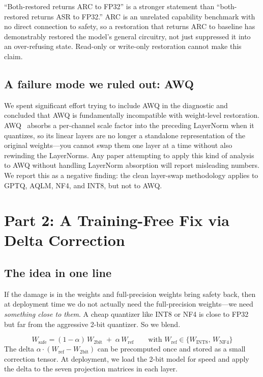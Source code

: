 \documentclass[11pt]{article}
\begin{document}
\begin{findingbox}
``Both-restored returns ARC to FP32'' is a stronger statement than ``both-restored returns ASR to FP32.'' ARC is an unrelated capability benchmark with no direct connection to safety, so a restoration that returns ARC to baseline has demonstrably restored the model's general circuitry, not just suppressed it into an over-refusing state. Read-only or write-only restoration cannot make this claim.
\end{findingbox}

\subsection{A failure mode we ruled out: AWQ}

We spent significant effort trying to include AWQ in the diagnostic and concluded that AWQ is fundamentally incompatible with weight-level restoration. AWQ~\cite{lin2024awq} absorbs a per-channel scale factor into the preceding LayerNorm when it quantizes, so its linear layers are no longer a standalone representation of the original weights---you cannot swap them one layer at a time without also rewinding the LayerNorms. Any paper attempting to apply this kind of analysis to AWQ without handling LayerNorm absorption will report misleading numbers. We report this as a negative finding: the clean layer-swap methodology applies to GPTQ, AQLM, NF4, and INT8, but not to AWQ.

\section{Part 2: A Training-Free Fix via Delta Correction}
\label{sec:part2}

\subsection{The idea in one line}

If the damage is in the weights and full-precision weights bring safety back, then at deployment time we do not actually need the full-precision weights---we need \emph{something close to them}. A cheap quantizer like INT8 or NF4 is close to FP32 but far from the aggressive 2-bit quantizer. So we blend.

\begin{conceptbox}
\[
W_{\text{safe}} = (1-\alpha)\, W_{\text{2bit}} \;+\; \alpha\, W_{\text{ref}}
\qquad \text{with } W_{\text{ref}} \in \{W_{\text{INT8}},\, W_{\text{NF4}}\}
\]
The delta $\alpha \cdot (W_{\text{ref}} - W_{\text{2bit}})$ can be precomputed once and stored as a small correction tensor. At deployment, we load the 2-bit model for speed and apply the delta to the seven projection matrices in each layer.
\end{conceptbox}
\end{document}
